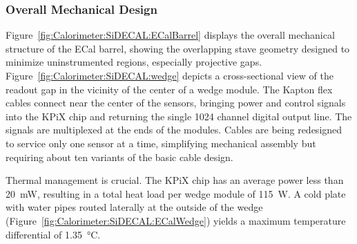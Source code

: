\subsubsection{Overall Mechanical Design}
Figure~\ref{fig:Calorimeter:SiDECAL:ECalBarrel} displays the overall mechanical structure of the ECal barrel, showing the overlapping stave geometry designed to minimize uninstrumented regions, especially projective gaps. Figure~\ref{fig:Calorimeter:SiDECAL:wedge} depicts a cross-sectional view of the readout gap in the vicinity of the center of a wedge module. The Kapton flex cables connect near the center of the sensors, bringing power and control signals into the KPiX chip and returning the single 1024 channel digital output line. The signals are multiplexed at the ends of the modules. Cables are being redesigned to service only one sensor at a time, simplifying mechanical assembly but requiring about ten variants of the basic cable design.

 Thermal management is crucial. The KPiX chip has an average power less than \SI{20}{mW}, resulting in a total heat load per wedge module of \SI{115}{W}. A cold plate with water pipes routed laterally at the outside of the wedge (Figure~\ref{fig:Calorimeter:SiDECAL:ECalWedge}) yields a maximum temperature differential of \SI{1.35}{\celsius}.

